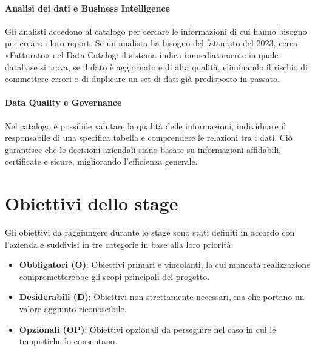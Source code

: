 \paragraph{Analisi dei dati e Business Intelligence}
Gli analisti accedono al catalogo per cercare le informazioni di cui hanno bisogno per creare i loro report. 
Se un analista ha bisogno del fatturato del 2023, cerca «Fatturato» nel Data Catalog: il sistema indica immediatamente in quale 
database si trova, se il dato è aggiornato e di alta qualità, eliminando il rischio di commettere errori o di duplicare un set di dati già predisposto in passato.

\paragraph{Data Quality e Governance}
Nel catalogo è possibile valutare la qualità delle informazioni, individuare il responsabile di una specifica tabella e comprendere le relazioni tra i dati. 
Ciò garantisce che le decisioni aziendali siano basate su informazioni affidabili, certificate e sicure, migliorando l'efficienza generale.

\section{Obiettivi dello stage}
Gli obiettivi da raggiungere durante lo stage sono stati definiti in accordo con l'azienda e suddivisi in tre categorie in base alla loro priorità:
\begin{itemize}
    \item \textbf{Obbligatori (O)}: Obiettivi primari e vincolanti, la cui mancata realizzazione comprometterebbe gli scopi principali del progetto.
    \item \textbf{Desiderabili (D)}: Obiettivi non strettamente necessari, ma che portano un valore aggiunto riconoscibile.
    \item \textbf{Opzionali (OP)}: Obiettivi opzionali da perseguire nel caso in cui le tempistiche lo consentano.
\end{itemize}


